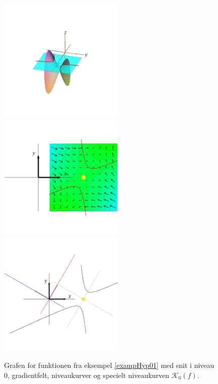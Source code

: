 \begin{figure}[ht]
\centerline{  \includegraphics[height=60mm]{FIGS/plot2DNivHypLift01.pdf} \includegraphics[height=60mm]{FIGS/plot2DGradHyp01.pdf} \includegraphics[height=60mm]{FIGS/plotHypKvad01.pdf}}
\begin{center}
\caption{Grafen for funktionen fra eksempel \ref{exampHyp01} med snit i niveau $0$, gradientfelt, niveaukurver og specielt niveaukurven $\mathcal{K}_{0}(f)$.} \label{figHyp01Kvad}
\end{center}
\end{figure}






